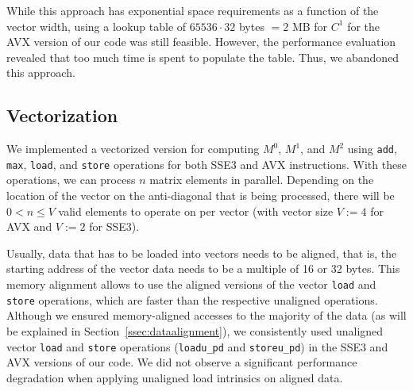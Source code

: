 \documentclass[runningheads,a4paper]{llncs}
\begin{document}
While this approach has exponential space requirements as a function of the vector width, using a lookup table of $65536 \cdot 32$ bytes $= 2$ MB for $C^1$ for
the AVX version of our code was still feasible.
However, the performance evaluation revealed that too much time is spent to populate the table.
Thus, we abandoned this approach.



\subsection{Vectorization}
\label{ssec:vectorization}

We implemented a vectorized version for computing
$M^0$, $M^1$, and $M^2$ using \texttt{add}, \texttt{max}, \texttt{load}, and \texttt{store}
operations for both SSE3 and AVX instructions.
With these operations, we can process $n$ matrix elements in parallel.
Depending on the location of the vector on the anti-diagonal that is being processed, there will be $0 < n \leq V$ valid elements to operate on
per vector (with vector size $V := 4$ for AVX and $V := 2$ for SSE3).

Usually, data that has to be loaded into vectors needs to be aligned, that is, the starting 
address of the vector data needs to be a multiple of 16 or 32 bytes. This memory alignment allows to
use the aligned versions of the vector \texttt{load} and \texttt{store} operations,
which are faster than the respective unaligned operations.
Although we ensured memory-aligned accesses to the majority of the data (as will be explained in
Section~\ref{ssec:dataalignment}), we consistently used unaligned vector \texttt{load} and \texttt{store}
operations (\texttt{loadu\_pd} and \texttt{storeu\_pd}) in the SSE3 and AVX versions of our code.
We did not observe a significant performance degradation when
applying unaligned load intrinsics on aligned data.
\end{document}

